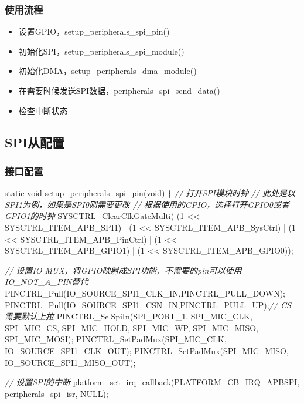 \documentclass[
  12pt,
]{book}
\newenvironment{Shaded}{\begin{snugshade}}{\end{snugshade}}
\newcommand{\CommentTok}[1]{\textcolor[rgb]{0.56,0.35,0.01}{\textit{#1}}}
\newcommand{\DataTypeTok}[1]{\textcolor[rgb]{0.13,0.29,0.53}{#1}}
\newcommand{\DecValTok}[1]{\textcolor[rgb]{0.00,0.00,0.81}{#1}}
\newcommand{\NormalTok}[1]{#1}
\providecommand{\tightlist}{%
  \setlength{\itemsep}{0pt}\setlength{\parskip}{0pt}}
\begin{document}
\hypertarget{ux4f7fux7528ux6d41ux7a0b-16}{%
\subsubsection{使用流程}\label{ux4f7fux7528ux6d41ux7a0b-16}}

\begin{itemize}
\tightlist
\item
  设置GPIO，setup\_peripherals\_spi\_pin()
\item
  初始化SPI，setup\_peripherals\_spi\_module()
\item
  初始化DMA，setup\_peripherals\_dma\_module()
\item
  在需要时候发送SPI数据，peripherals\_spi\_send\_data()
\item
  检查中断状态
\end{itemize}

\hypertarget{spiux4eceux914dux7f6e-3}{%
\subsection{SPI从配置}\label{spiux4eceux914dux7f6e-3}}

\hypertarget{ux63a5ux53e3ux914dux7f6e-7}{%
\subsubsection{接口配置}\label{ux63a5ux53e3ux914dux7f6e-7}}

\begin{Shaded}
\begin{Highlighting}[]
\DataTypeTok{static} \DataTypeTok{void}\NormalTok{ setup_peripherals_spi_pin(}\DataTypeTok{void}\NormalTok{)}
\NormalTok{\{}
    \CommentTok{// 打开SPI模块时钟}
    \CommentTok{// 此处是以SPI1为例，如果是SPI0则需要更改}
    \CommentTok{// 根据使用的GPIO，选择打开GPIO0或者GPIO1的时钟}
\NormalTok{    SYSCTRL_ClearClkGateMulti(    (}\DecValTok{1}\NormalTok{ << SYSCTRL_ITEM_APB_SPI1)}
\NormalTok{                                | (}\DecValTok{1}\NormalTok{ << SYSCTRL_ITEM_APB_SysCtrl)}
\NormalTok{                                | (}\DecValTok{1}\NormalTok{ << SYSCTRL_ITEM_APB_PinCtrl)}
\NormalTok{                                | (}\DecValTok{1}\NormalTok{ << SYSCTRL_ITEM_APB_GPIO1)}
\NormalTok{                                | (}\DecValTok{1}\NormalTok{ << SYSCTRL_ITEM_APB_GPIO0));}

    \CommentTok{// 设置IO MUX，将GPIO映射成SPI功能，不需要的pin可以使用IO_NOT_A_PIN替代}
\NormalTok{    PINCTRL_Pull(IO_SOURCE_SPI1_CLK_IN,PINCTRL_PULL_DOWN);}
\NormalTok{    PINCTRL_Pull(IO_SOURCE_SPI1_CSN_IN,PINCTRL_PULL_UP);}\CommentTok{// CS 需要默认上拉}
\NormalTok{    PINCTRL_SelSpiIn(SPI_PORT_1, SPI_MIC_CLK, SPI_MIC_CS, SPI_MIC_HOLD, SPI_MIC_WP, SPI_MIC_MISO, SPI_MIC_MOSI);}
\NormalTok{    PINCTRL_SetPadMux(SPI_MIC_CLK, IO_SOURCE_SPI1_CLK_OUT);}
\NormalTok{    PINCTRL_SetPadMux(SPI_MIC_MISO, IO_SOURCE_SPI1_MISO_OUT);}
    
    \CommentTok{// 设置SPI的中断}
\NormalTok{    platform_set_irq_callback(PLATFORM_CB_IRQ_APBSPI, peripherals_spi_isr, NULL);}
\end{Highlighting}
\end{Shaded}
\end{document}

